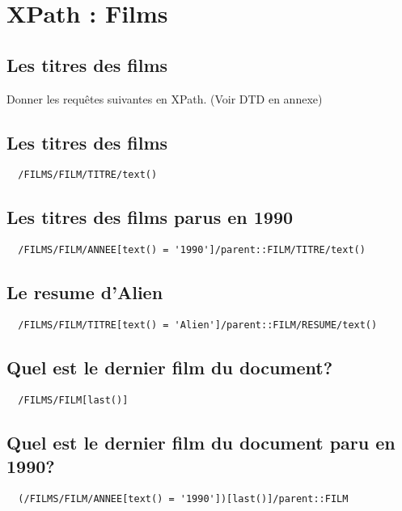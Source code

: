 \chapter{XPath : Films}
\section{Les titres des films}
Donner les requêtes suivantes en XPath.
(Voir DTD en annexe)

\section{Les titres des films}
\begin{verbatim}
  /FILMS/FILM/TITRE/text()
\end{verbatim}

\section{Les titres des films parus en 1990}
\begin{verbatim}
  /FILMS/FILM/ANNEE[text() = '1990']/parent::FILM/TITRE/text()
\end{verbatim}

\section{Le resume d'Alien}
\begin{verbatim}
  /FILMS/FILM/TITRE[text() = 'Alien']/parent::FILM/RESUME/text()
\end{verbatim}

\section{Quel est le dernier film du document?}
\begin{verbatim}
  /FILMS/FILM[last()]
\end{verbatim}

\section{Quel est le dernier film du document paru en 1990?}
\begin{verbatim}
  (/FILMS/FILM/ANNEE[text() = '1990'])[last()]/parent::FILM
\end{verbatim}

